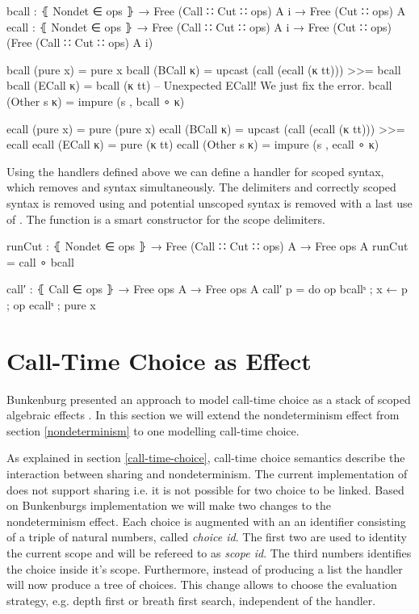 \begin{code}
bcall : ⦃ Nondet ∈ ops ⦄ → Free (Call ∷ Cut ∷ ops) A {i} → Free (Cut ∷ ops) A
ecall : ⦃ Nondet ∈ ops ⦄ → Free (Call ∷ Cut ∷ ops) A {i}
  → Free (Cut ∷ ops) (Free (Call ∷ Cut ∷ ops) A {i})

bcall (pure x)     = pure x
bcall (BCall κ)    = upcast (call (ecall (κ tt))) >>= bcall
bcall (ECall κ)    = bcall (κ tt) -- Unexpected ECall! We just fix the error.
bcall (Other s κ)  = impure (s , bcall ∘ κ)

ecall (pure x)     = pure (pure x)
ecall (BCall κ)    = upcast (call (ecall (κ tt))) >>= ecall
ecall (ECall κ)    = pure (κ tt)
ecall (Other s κ)  = impure (s , ecall ∘ κ)
\end{code}
Using the handlers defined above we can define a handler for scoped
 syntax, which removes  and
 syntax simultaneously.
The delimiters and correctly scoped  syntax is removed using
 and potential unscoped  syntax is
removed with a last use of .
The function  is a smart constructor for the scope
delimiters.

\begin{code}
runCut : ⦃ Nondet ∈ ops ⦄ → Free (Call ∷ Cut ∷ ops) A → Free ops A
runCut = call ∘ bcall

call′ : ⦃ Call ∈ ops ⦄ → Free ops A → Free ops A
call′ p = do op bcallˢ ; x ← p ; op ecallˢ ; pure x
\end{code}

\section{Call-Time Choice as Effect}

Bunkenburg presented an approach to model call-time choice as a stack of
scoped algebraic effects \cite{bunkenburg2019modeling}.
In this section we will extend the nondeterminism effect from section
\ref{nondeterminism} to one modelling call-time choice.

As explained in section \ref{call-time-choice}, call-time choice semantics
describe the interaction between sharing and nondeterminism.
The current implementation of  does not support sharing
i.e. it is not possible for two choice to be linked.
Based on Bunkenburgs implementation we will make two changes to the
nondeterminism effect.
Each choice is augmented with an an identifier consisting of a triple of natural
numbers, called \textit{choice id}.
The first two are used to identity the current scope and will be refereed to as
\textit{scope id}.
The third numbers identifies the choice inside it's scope.
Furthermore, instead of producing a list the handler will now produce a tree of
choices.
This change allows to choose the evaluation strategy, e.g. depth first or breath
first search, independent of the handler.
